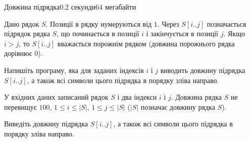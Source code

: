 \begin{problem}{Довжина підрядка}{}{}{0.2 секунди}{64 мегабайти}

Дано рядок $S$. Позиції в рядку нумеруються від $1$. Через $S[i..j]$ позначається підрядок рядка $S$, 
що починається в позиції $i$ і закінчується в позиції $j$. 
Якщо $i > j$, то $S[i..j]$ вважається порожнім рядком (довжина порожнього рядка дорівнює 0). 

Напишіть програму, яка для заданих індексів $i$ і $j$ виводить довжину підрядка $S[i..j]$, 
а також всі символи цього підрядка в порядку зліва направо. 

\InputFile
У вхідних даних записаний рядок $S$ і два індекси $i$ і $j$. Довжина рядка $S$ не перевищує $100$, $1 \le i \le |S|$, $1 \le j \le |S|$
($|S|$ позначає довжину рядка $S$).

\OutputFile
Виведіть довжину підрядка $S[i..j]$, 
а також всі символи цього підрядка в порядку зліва направо.

\Examples

\begin{example}
%
%
\end{example}

\end{problem}

